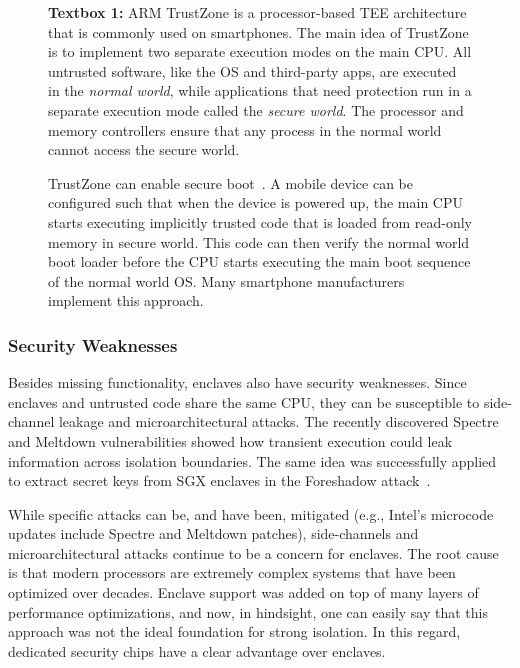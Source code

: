 \begin{figure}
    \begin{tcolorbox}
    \textbf{Textbox 1:} 
    ARM TrustZone is a processor-based TEE architecture that is commonly used on smartphones. The main idea of TrustZone is to implement two separate execution modes on the main CPU. All untrusted software, like the OS and third-party apps, are executed in the \emph{normal world}, while applications that need protection run in a separate execution mode called the \emph{secure world}. The processor and memory controllers ensure that any process in the normal world cannot access the secure world.
    
    \hspace{10pt} TrustZone can enable secure boot~\cite{ekberg2014untapped}. A mobile device can be configured such that when the device is powered up, the main CPU starts executing implicitly trusted code that is loaded from read-only memory in secure world. This code can then verify the normal world boot loader before the CPU starts executing the main boot sequence of the normal world OS. Many smartphone manufacturers implement this approach.
	\end{tcolorbox}
\end{figure}  


\subsubsection*{Security Weaknesses}

Besides missing functionality, enclaves also have security weaknesses. Since enclaves and untrusted code share the same CPU, they can be susceptible to side-channel leakage and microarchitectural attacks. The recently discovered Spectre and Meltdown vulnerabilities showed how transient execution could leak information across isolation boundaries. The same idea was successfully applied to extract secret keys from SGX enclaves in the Foreshadow attack~\cite{van2018foreshadow}. 

While specific attacks can be, and have been, mitigated (e.g., Intel's microcode updates include Spectre and Meltdown patches), side-channels and microarchitectural attacks continue to be a concern for enclaves. The root cause is that modern processors are extremely complex systems that have been optimized over decades. Enclave support was added on top of many layers of performance optimizations, and now, in hindsight, one can easily say that this approach was not the ideal foundation for strong isolation. In this regard, dedicated security chips have a clear advantage over enclaves.


